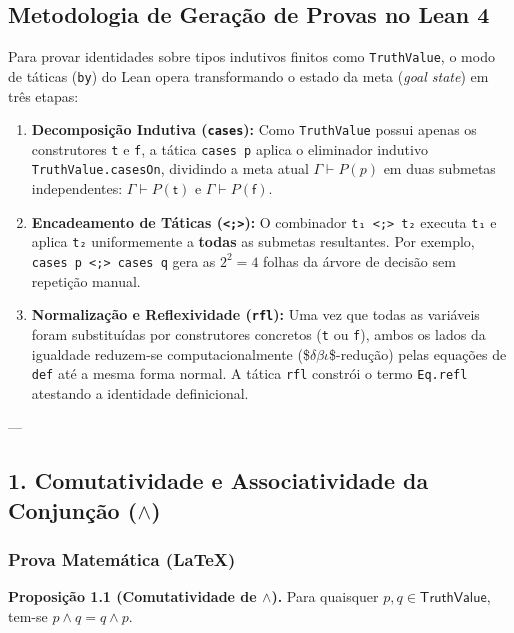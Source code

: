 \documentclass[11pt,a4paper]{scrartcl}
\begin{document}
\subsection{Metodologia de Geração de Provas no Lean 4}
\label{sec:orged8c472}
Para provar identidades sobre tipos indutivos finitos como \texttt{TruthValue}, o modo de táticas (\texttt{by}) do Lean opera transformando o estado da meta (\emph{goal state}) em três etapas:

\begin{enumerate}
\item \textbf{Decomposição Indutiva (\texttt{cases}):} Como \texttt{TruthValue} possui apenas os construtores \texttt{t} e \texttt{f}, a tática \texttt{cases p} aplica o eliminador indutivo \texttt{TruthValue.casesOn}, dividindo a meta atual \(\Gamma \vdash P(p)\) em duas submetas independentes: \(\Gamma \vdash P(\mathsf{t})\) e \(\Gamma \vdash P(\mathsf{f})\).
\item \textbf{Encadeamento de Táticas (\texttt{<;>}):} O combinador \texttt{t₁ <;> t₂} executa \texttt{t₁} e aplica \texttt{t₂} uniformemente a \textbf{todas} as submetas resultantes. Por exemplo, \texttt{cases p <;> cases q} gera as \(2^2 = 4\) folhas da árvore de decisão sem repetição manual.
\item \textbf{Normalização e Reflexividade (\texttt{rfl}):} Uma vez que todas as variáveis foram substituídas por construtores concretos (\texttt{t} ou \texttt{f}), ambos os lados da igualdade reduzem-se computacionalmente (\$\(\delta \beta \iota\)\$-redução) pelas equações de \texttt{def} até a mesma forma normal. A tática \texttt{rfl} constrói o termo \texttt{Eq.refl} atestando a identidade definicional.
\end{enumerate}

---
\subsection{1. Comutatividade e Associatividade da Conjunção (\(\land\))}
\label{sec:org3f3ec4f}

\subsubsection{Prova Matemática (\LaTeX{})}
\label{sec:orgdd61ea2}
\textbf{Proposição 1.1 (Comutatividade de \(\land\)).} Para quaisquer \(p, q \in \mathsf{TruthValue}\), tem-se \(p \land q = q \land p\).
\end{document}
